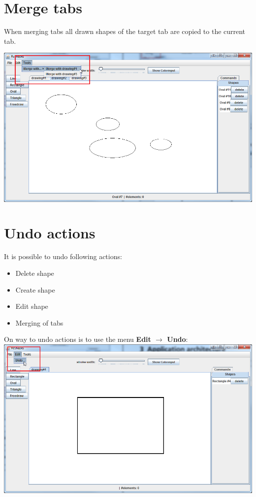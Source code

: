 \section{Merge tabs}

When merging tabs all drawn shapes of the target tab are copied to the current tab.

\includegraphics[width=1\textwidth]{img/merge_tabs}

\section{Undo actions}

It is possible to undo following actions:
\begin{itemize}
    \item Delete shape
    \item Create shape
    \item Edit shape
    \item Merging of tabs
\end{itemize}

On way to undo actions is to use the menu \textbf{Edit $\rightarrow$ Undo}: \\
\includegraphics[width=1\textwidth]{img/undo_action_1} \\

